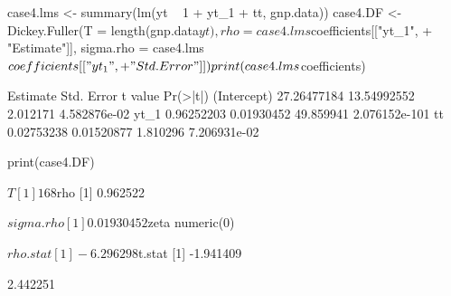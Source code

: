 \documentclass[a4paper]{article}
\renewcommand{\~}{\perispomeni}%
\begin{document}
\begin{Schunk}
\begin{Sinput}
 case4.lms <- summary(lm(yt ~ 1 + yt_1 + tt, gnp.data))
 case4.DF <- Dickey.Fuller(T = length(gnp.data$yt), rho = case4.lms$coefficients[["yt_1", 
+     "Estimate"]], sigma.rho = case4.lms$coefficients[["yt_1", 
+     "Std. Error"]])
 print(case4.lms$coefficients)
\end{Sinput}
\begin{Soutput}
               Estimate  Std. Error   t value      Pr(>|t|)
(Intercept) 27.26477184 13.54992552  2.012171  4.582876e-02
yt_1         0.96252203  0.01930452 49.859941 2.076152e-101
tt           0.02753238  0.01520877  1.810296  7.206931e-02
\end{Soutput}
\begin{Sinput}
 print(case4.DF)
\end{Sinput}
\begin{Soutput}
$T
[1] 168

$rho
[1] 0.962522

$sigma.rho
[1] 0.01930452

$zeta
numeric(0)

$rho.stat
[1] -6.296298

$t.stat
[1] -1.941409
\end{Soutput}
\begin{Soutput}
[1] 2.442251
\end{Soutput}
\end{Schunk}
\end{document}
